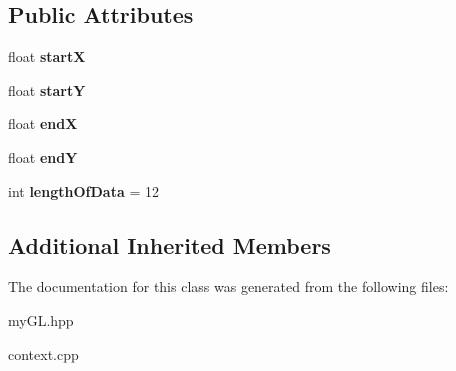 \subsection*{Public Attributes}
\begin{DoxyCompactItemize}
\item 
float {\bfseries startX}\hypertarget{classRectangle_a1999e2aa3c8ee35d2f57f90cb376b7c6}{}\label{classRectangle_a1999e2aa3c8ee35d2f57f90cb376b7c6}

\item 
float {\bfseries startY}\hypertarget{classRectangle_a0620f8b1b4a30cfd3bcc826811916a13}{}\label{classRectangle_a0620f8b1b4a30cfd3bcc826811916a13}

\item 
float {\bfseries endX}\hypertarget{classRectangle_aa250ce84a1649311b750558201b2bfc5}{}\label{classRectangle_aa250ce84a1649311b750558201b2bfc5}

\item 
float {\bfseries endY}\hypertarget{classRectangle_abf43dca674d8142c428448283b4274c8}{}\label{classRectangle_abf43dca674d8142c428448283b4274c8}

\item 
int {\bfseries length\+Of\+Data} = 12\hypertarget{classRectangle_a4fbb1c8e4315a2fba2242959ba8bf4fa}{}\label{classRectangle_a4fbb1c8e4315a2fba2242959ba8bf4fa}

\end{DoxyCompactItemize}
\subsection*{Additional Inherited Members}


The documentation for this class was generated from the following files\+:\begin{DoxyCompactItemize}
\item 
my\+G\+L.\+hpp\item 
context.\+cpp\end{DoxyCompactItemize}
